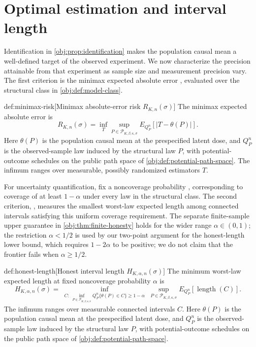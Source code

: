 \section{Optimal estimation and interval length}

Identification in \cref{obj:prop:identification} makes the population causal mean a well-defined target of the observed experiment. We now characterize the precision attainable from that experiment as sample size and measurement precision vary. The first criterion is the minimax expected absolute error , evaluated over the structural class in \cref{obj:def:model-class}.

\begin{definitionv}{def:minimax-risk}[Minimax absolute-error risk $R_{K,n}(\sigma)$]
The minimax expected absolute error is
\[
R_{K,n}(\sigma)
=
\inf_T
\sup_{P\in\mathcal P_{K,\beta,\kappa,\sigma}}
E_{Q_P^n}\!\left[|T-\theta(P)|\right].
\]
Here \(\theta(P)\) is the population causal mean at the prespecified latent dose, and \(Q_P^n\) is the observed-sample law induced by the structural law \(P\), with potential-outcome schedules on the public path space of \cref{obj:def:potential-path-space}. The infimum ranges over measurable, possibly randomized estimators \(T\).
\end{definitionv}

For uncertainty quantification, fix a noncoverage probability , corresponding to coverage of at least \(1-\alpha\) under every law in the structural class. The second criterion, , measures the smallest worst-law expected length among connected intervals satisfying this uniform coverage requirement. The separate finite-sample upper guarantee in \cref{obj:thm:finite-honesty} holds for the wider range \(\alpha\in(0,1)\); the restriction \(\alpha<1/2\) is used by our two-point argument for the honest-length lower bound, which requires \(1-2\alpha\) to be positive; we do not claim that the frontier fails when \(\alpha\ge1/2\).

\begin{definitionv}{def:honest-length}[Honest interval length $H_{K,\alpha,n}(\sigma)$]
The minimum worst-law expected length at fixed noncoverage probability \(\alpha\) is
\[
H_{K,\alpha,n}(\sigma)
=
\inf_{\substack{
C:\ \inf_{P\in\mathcal P_{K,\beta,\kappa,\sigma}}
Q_P^n\{\theta(P)\in C\}\ge 1-\alpha
}}
\sup_{P\in\mathcal P_{K,\beta,\kappa,\sigma}}
E_{Q_P^n}\!\left[\operatorname{length}(C)\right].
\]
The infimum ranges over measurable connected intervals \(C\). Here \(\theta(P)\) is the population causal mean at the prespecified latent dose, and \(Q_P^n\) is the observed-sample law induced by the structural law \(P\), with potential-outcome schedules on the public path space of \cref{obj:def:potential-path-space}.
\end{definitionv}

